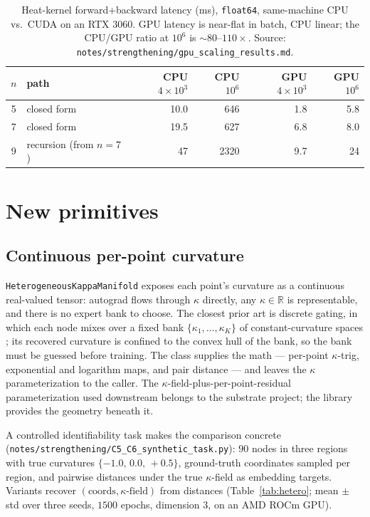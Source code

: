 \documentclass{article}
\newcommand{\R}{\mathbb{R}}
\newcommand{\kp}{\kappa}
\newcommand{\code}[1]{\texttt{#1}}
\begin{document}
\begin{table}[t]
  \centering
  \caption{Heat-kernel forward+backward latency (ms), \code{float64},
  same-machine CPU vs.\ CUDA on an RTX 3060. GPU latency is near-flat in
  batch, CPU linear; the CPU/GPU ratio at $10^6$ is
  $\sim\!80$--$110\times$. Source:
  \code{notes/strengthening/gpu\_scaling\_results.md}.}
  \label{tab:gpuscale}
  \begin{tabular}{clrrrr}
    \toprule
    $n$ & path & CPU $4{\times}10^3$ & CPU $10^6$ & GPU $4{\times}10^3$ & GPU $10^6$ \\
    \midrule
    5 & closed form & 10.0 & 646 & 1.8 & 5.8 \\
    7 & closed form & 19.5 & 627 & 6.8 & 8.0 \\
    9 & recursion (from $n{=}7$) & 47 & 2320 & 9.7 & 24 \\
    \bottomrule
  \end{tabular}
\end{table}

\section{New primitives}
\label{sec:primitives}

\subsection{Continuous per-point curvature}
\label{sec:c5}

\code{HeterogeneousKappaManifold} exposes each point's curvature as a
continuous real-valued tensor: autograd flows through $\kp$ directly,
any $\kp \in \R$ is representable, and there is no expert bank to choose.
The closest prior art is discrete gating, in which each node mixes over a
fixed bank $\{\kp_1,\dots,\kp_K\}$ of constant-curvature spaces
\citep{guo2025graphmore}; its recovered curvature is confined to the
convex hull of the bank, so the bank must be guessed before training. The
class supplies the math --- per-point $\kp$-trig, exponential and
logarithm maps, and pair distance --- and leaves the $\kp$
parameterization to the caller. The $\kp$-field-plus-per-point-residual
parameterization used downstream belongs to the substrate project; the
library provides the geometry beneath it.

A controlled identifiability task makes the comparison concrete
(\code{notes/strengthening/C5\_C6\_synthetic\_task.py}): $90$ nodes in
three regions with true curvatures $\{-1.0,\,0.0,\,+0.5\}$, ground-truth
coordinates sampled per region, and pairwise distances under the true
$\kp$-field as embedding targets. Variants recover $(\text{coords},
\kp\text{-field})$ from distances (Table~\ref{tab:hetero}; mean $\pm$ std
over three seeds, $1500$ epochs, dimension $3$, on an AMD ROCm GPU).
\end{document}
